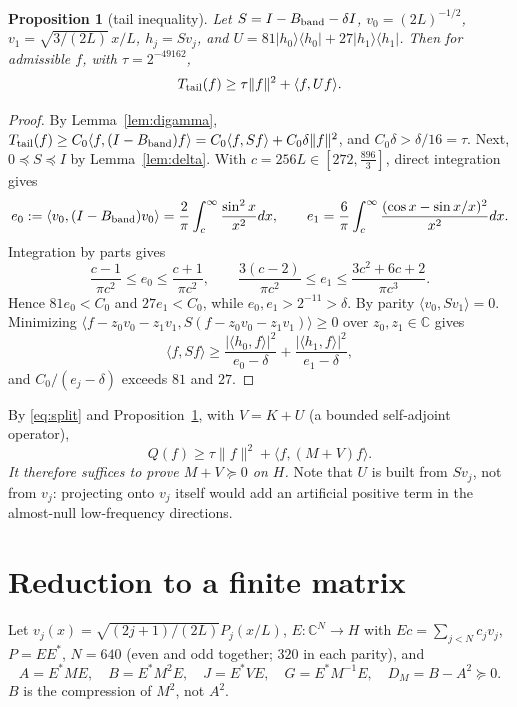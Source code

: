 \documentclass[11pt]{amsart}
\newtheorem{proposition}{Proposition}[section]
\theoremstyle{remark}
\numberwithin{equation}{section}
\newcommand{\C}{\mathbb{C}}
\begin{document}
\begin{proposition}[tail inequality]\label{prop:tail}
Let $S=I-B_{\rm band}-\delta I$, $v_0=(2L)^{-1/2}$, $v_1=\sqrt{3/(2L)}\,x/L$, $h_j=Sv_j$, and $U=81|h_0\rangle\langle h_0|+27|h_1\rangle\langle h_1|$. Then for admissible $f$, with $\tau=2^{-49162}$,
\[
T_{\rm tail}(f)\ge\tau\|f\|^2+\langle f,Uf\rangle .
\]
\end{proposition}
\begin{proof}
By Lemma~\ref{lem:digamma}, $T_{\rm tail}(f)\ge C_0\langle f,(I-B_{\rm band})f\rangle=C_0\langle f,Sf\rangle+C_0\delta\|f\|^2$, and $C_0\delta>\delta/16=\tau$. Next, $0\preceq S\preceq I$ by Lemma~\ref{lem:delta}. With $c=256L\in[272,\frac{896}3]$, direct integration gives
\[
e_0:=\langle v_0,(I-B_{\rm band})v_0\rangle=\frac2\pi\int_c^\infty\frac{\sin^2x}{x^2}dx,\qquad
e_1=\frac6\pi\int_c^\infty\frac{(\cos x-\sin x/x)^2}{x^2}dx .
\]
Integration by parts gives
\[
\frac{c-1}{\pi c^2}\le e_0\le\frac{c+1}{\pi c^2},\qquad
\frac{3(c-2)}{\pi c^2}\le e_1\le\frac{3c^2+6c+2}{\pi c^3}.
\]
Hence $81e_0<C_0$ and $27e_1<C_0$, while $e_0,e_1>2^{-11}>\delta$. By parity $\langle v_0,Sv_1\rangle=0$. Minimizing $\langle f-z_0v_0-z_1v_1,S(f-z_0v_0-z_1v_1)\rangle\ge0$ over $z_0,z_1\in\C$ gives
\[
\langle f,Sf\rangle\ge\frac{|\langle h_0,f\rangle|^2}{e_0-\delta}+\frac{|\langle h_1,f\rangle|^2}{e_1-\delta},
\]
and $C_0/(e_j-\delta)$ exceeds $81$ and $27$.
\end{proof}

By \eqref{eq:split} and Proposition~\ref{prop:tail}, with $V=K+U$ (a bounded self-adjoint operator),
\begin{equation}\label{eq:reduction}
Q(f)\ge\tau\|f\|^2+\langle f,(M+V)f\rangle .
\end{equation}
\emph{It therefore suffices to prove $M+V\succeq0$ on $H$.} Note that $U$ is built from $Sv_j$, not from $v_j$: projecting onto $v_j$ itself would add an artificial positive term in the almost-null low-frequency directions.

\section{Reduction to a finite matrix}\label{sec:finite}

Let $v_j(x)=\sqrt{(2j+1)/(2L)}P_j(x/L)$, $E:\C^N\to H$ with $Ec=\sum_{j<N}c_jv_j$, $P=EE^*$, $N=640$ (even and odd together; $320$ in each parity), and
\[
A=E^*ME,\quad B=E^*M^2E,\quad J=E^*VE,\quad G=E^*M^{-1}E,\quad D_M=B-A^2\succeq0 .
\]
$B$ is the compression of $M^2$, not $A^2$.
\end{document}
